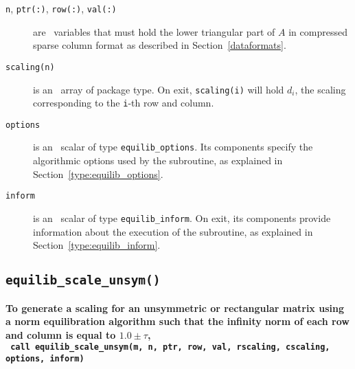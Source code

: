 \begin{description}

\item[\texttt{n}, \texttt{ptr(:)}, \texttt{row(:)}, \texttt{val(:)}] are \intentin\ variables that must hold the lower triangular part of $A$ in compressed sparse column format as described in Section~\ref{dataformats}.

\item[\texttt{scaling(n)}] is an \intentout\ array of package type. On exit,
\texttt{scaling(i)} will hold $d_i$, the scaling corresponding to the
\texttt{i}-th row and column.

\item[\texttt{options}] is an \intentin\ scalar of type \texttt{equilib\_options}. Its components specify the algorithmic options used by the subroutine, as explained in Section~\ref{type:equilib_options}.

\item[\texttt{inform}] is an \intentout\ scalar of type \texttt{equilib\_inform}. On exit, its components provide information about the execution of the subroutine, as explained in Section~\ref{type:equilib_inform}.

\end{description}

\subsection{\texttt{equilib\_scale\_unsym()}}

\textbf{\noindent
   To generate a scaling for an unsymmetric or rectangular matrix using a norm equilibration algorithm such that the infinity norm of each row and column is equal to $1.0\pm\tau$,
   \vspace*{0.3cm} \\
   \texttt{ \hspace*{0.2cm}
      call equilib\_scale\_unsym(m, n, ptr, row, val, rscaling, cscaling, options, inform)
   }
   \vspace{0.3cm}
}

